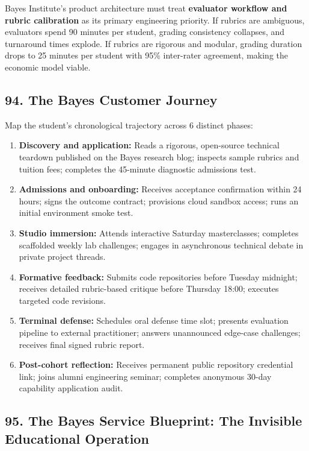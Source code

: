 Bayes Institute's product architecture must treat \textbf{evaluator workflow and rubric calibration} as its primary engineering priority. If rubrics are ambiguous, evaluators spend 90 minutes per student, grading consistency collapses, and turnaround times explode. If rubrics are rigorous and modular, grading duration drops to 25 minutes per student with 95\% inter-rater agreement, making the economic model viable.

\subsection*{94. The Bayes Customer Journey}

Map the student's chronological trajectory across 6 distinct phases:
\begin{enumerate}
    \item \textbf{Discovery and application:} Reads a rigorous, open-source technical teardown published on the Bayes research blog; inspects sample rubrics and tuition fees; completes the 45-minute diagnostic admissions test.
    \item \textbf{Admissions and onboarding:} Receives acceptance confirmation within 24 hours; signs the outcome contract; provisions cloud sandbox access; runs an initial environment smoke test.
    \item \textbf{Studio immersion:} Attends interactive Saturday masterclasses; completes scaffolded weekly lab challenges; engages in asynchronous technical debate in private project threads.
    \item \textbf{Formative feedback:} Submits code repositories before Tuesday midnight; receives detailed rubric-based critique before Thursday 18:00; executes targeted code revisions.
    \item \textbf{Terminal defense:} Schedules oral defense time slot; presents evaluation pipeline to external practitioner; answers unannounced edge-case challenges; receives final signed rubric report.
    \item \textbf{Post-cohort reflection:} Receives permanent public repository credential link; joins alumni engineering seminar; completes anonymous 30-day capability application audit.
\end{enumerate}

\subsection*{95. The Bayes Service Blueprint: The Invisible Educational Operation}

